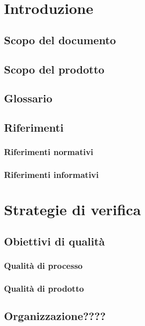 \documentclass[a4paper, oneside, openany, dvipsnames, table]{article}
\begin{document}
\copertina{}

\newpage
\tableofcontents
\newpage
\section{Introduzione}
	\subsection{Scopo del documento}
		
	\subsection{Scopo del prodotto}
		
	\subsection{Glossario}
		
	\subsection{Riferimenti}
		\subsubsection{Riferimenti normativi}
			
		\subsubsection{Riferimenti informativi}
			
	\newpage
\section{Strategie di verifica}
	
	\subsection{Obiettivi di qualità}
		\subsubsection{Qualità di processo}
			
		\subsubsection{Qualità di prodotto}
			
	\subsection{Organizzazione????}
\end{document}
